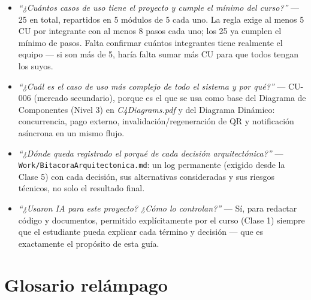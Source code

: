 \documentclass[12pt,a4paper]{article}
\begin{document}
\begin{pregunta}
\begin{itemize}
\item \textit{``¿Cuántos casos de uso tiene el proyecto y cumple el mínimo del curso?''} --- 25 en
total, repartidos en 5 módulos de 5 cada uno. La regla exige al menos 5 CU por integrante con al
menos 8 pasos cada uno; los 25 ya cumplen el mínimo de pasos. Falta confirmar cuántos integrantes
tiene realmente el equipo --- si son más de 5, haría falta sumar más CU para que todos tengan los
suyos.
\item \textit{``¿Cuál es el caso de uso más complejo de todo el sistema y por qué?''} --- CU-006
(mercado secundario), porque es el que se usa como base del Diagrama de Componentes (Nivel 3) en
\textit{C4Diagrams.pdf} y del Diagrama Dinámico: concurrencia, pago externo, invalidación/regeneración
de QR y notificación asíncrona en un mismo flujo.
\item \textit{``¿Dónde queda registrado el porqué de cada decisión arquitectónica?''} ---
\texttt{Work/BitacoraArquitectonica.md}: un log permanente (exigido desde la Clase 5) con cada
decisión, sus alternativas consideradas y sus riesgos técnicos, no solo el resultado final.
\item \textit{``¿Usaron IA para este proyecto? ¿Cómo lo controlan?''} --- Sí, para redactar código y
documentos, permitido explícitamente por el curso (Clase 1) siempre que el estudiante pueda explicar
cada término y decisión --- que es exactamente el propósito de esta guía.
\end{itemize}
\end{pregunta}

\section{Glosario relámpago}
\end{document}
